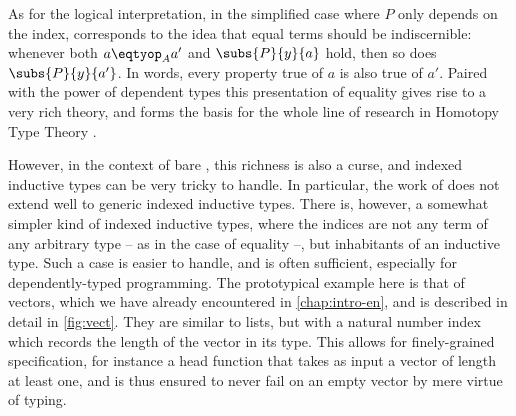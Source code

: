 As for the logical interpretation, in the simplified case where $P$ only depends on the index,
 corresponds to the idea that equal terms should be indiscernible:
whenever both $\eqty[A]{a}{a'}$ and $\subs{P}{y}{a}$ hold, then so does $\subs{P}{y}{a'}$.
In words, every property true of $a$ is also true of $a'$. Paired with the power of
dependent types this presentation of equality gives rise to a very rich theory, and
forms the basis for the whole line of research in Homotopy Type Theory .

However, in the context of bare , this richness is also
a curse, and indexed inductive types can be very tricky to handle. In particular, the
work of  does not extend well to generic indexed inductive types.
There is, however, a somewhat simpler kind of indexed inductive types, where the indices are
not any term of any arbitrary type – as in the case of equality –,
but inhabitants of an inductive type.
Such a case is easier to handle, and is often sufficient, especially for
dependently-typed programming. The prototypical example here is that of vectors, which
we have already encountered in \cref{chap:intro-en}, and is described in
detail in \cref{fig:vect}. They are similar to
lists, but with a natural number index which records the length of the vector in its type.
This allows for finely-grained specification, for instance a head function that takes as input 
a vector of length at least one, and is thus ensured to never fail on an empty vector
by mere virtue of typing.

